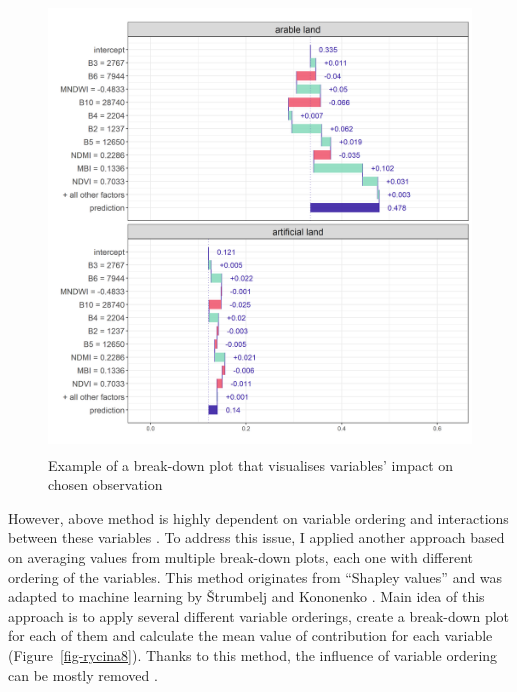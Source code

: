 \documentclass{amuthesis}
\begin{document}
\begin{figure}[H]

{\centering \includegraphics[width=4.54167in,height=4.6875in]{./figures/break-down_plot.png}

}

\caption{\label{fig-rycina7}Example of a break-down plot that visualises
variables' impact on chosen observation}

\end{figure}

However, above method is highly dependent on variable ordering and
interactions between these variables \autocite{biecek_explanatory_2021}.
To address this issue, I applied another approach based on averaging
values from multiple break-down plots, each one with different ordering
of the variables. This method originates from ``Shapley values''
\autocite{shapley_value_1953} and was adapted to machine learning by
Štrumbelj and Kononenko \autocite*{strumbelj_efficient_2010}. Main idea
of this approach is to apply several different variable orderings,
create a break-down plot for each of them and calculate the mean value
of contribution for each variable (Figure~\ref{fig-rycina8}). Thanks to
this method, the influence of variable ordering can be mostly removed
\autocite{biecek_explanatory_2021}.
\end{document}
